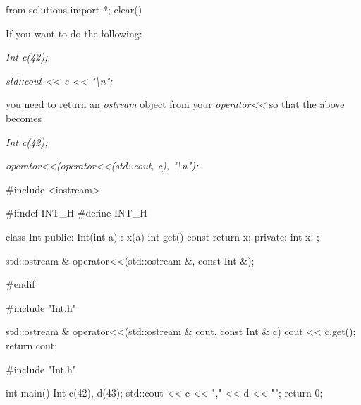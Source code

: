 \begin{python0}
from solutions import *; clear()
\end{python0}

If you want to do the following:

\textit{Int c(42);}

\textit{std::cout << c << "\textbackslash n";}

you need to return an \textit{ostream} object from your
\textit{operator<<} so that the above becomes

\textit{Int c(42);}

\textit{operator<<(operator<<(std::cout, c), "\textbackslash n");}

\begin{consolethree}[escapeinside=||]
#include <iostream>

#ifndef INT_H
#define INT_H

class Int
{
public:
    Int(int a)
        : x(a)
    {}
    int get() const { return x; }
private:
    int x;
};

std::ostream & operator<<(std::ostream &, const Int &);

#endif
\end{consolethree}

\begin{consolethree}[escapeinside=||]
#include "Int.h"

std::ostream & operator<<(std::ostream & cout, const Int & c) {
    cout << c.get();
    return cout;
}
\end{consolethree}

\begin{consolethree}[escapeinside=||]
#include "Int.h"

int main()
{
    Int c(42), d(43);
    std::cout << c << "," << d << "\n";
    return 0;
}
\end{consolethree}


